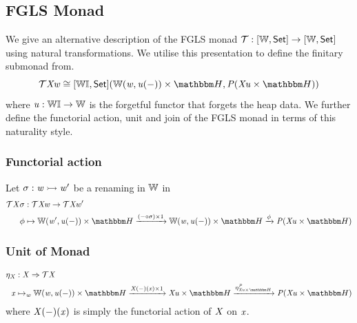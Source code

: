 
\subsection{FGLS Monad}
\label{sec:fgls-monad}

We give an alternative description of the FGLS monad $\mathcal{T} : [\mathbb{W}, \mathsf{Set}] \to [\mathbb{W}, \mathsf{Set}]$ using natural transformations. 
We utilise this presentation to define the finitary submonad from.
\[
    \monFLS\vX\vw \iso \homF{\funC\instC\setC}{\homF\worldC\vw{\instU(\dash)} \times \heapF}{\vP(\vX\instU \times \heapF)}
\]
where $\mathit{u} : \mathbb{W}\mathbb{I} \to \mathbb{W}$ is the forgetful functor that forgets the heap data.
We further define the functorial action, unit and join of the FGLS monad in terms of this naturality style.

\subsubsection*{Functorial action}

\begin{definition}
    Let $\sigma :  \mathit{w} \rightarrowtail \mathit{w}'$ be a renaming in $\mathbb{W}$ in
\begin{align*}
    \monFLS\vX\sigma & : \monFLS\vX\vw \to \monFLS\vX\vw' \\
    \phi & \mapsto \homF\worldC{\vw'}{\instU(\dash)} \times \heapF \xto{(\dash \comp \sigma) \times 1} 
    \homF\worldC\vw{\instU(\dash)} \times \heapF \xto\phi \vP(\vX\instU \times \heapF)
\end{align*}
\end{definition}

\subsubsection*{Unit of Monad}


\begin{definition}
\begin{align*}
    \eta_\vX & : \vX \To \monFLS\vX \\
    \vx      & \mapsto_\vw \homF\worldC\vw{\instU(\dash)} \times \heapF \xto{\vX(\dash)(\vx) \times 1} \vX\instU \times \heapF 
                                                          \xto{\eta^\vP_{\vX\instU \times \heapF}} \vP(\vX\instU \times \heapF)
\end{align*}
where $\mathit{X}(-)(\mathit{x})$ is simply the functorial action of $\mathit{X}$ on $\mathit{x}$.
\end{definition}

